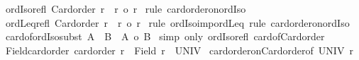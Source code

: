 \begin{isabellebody}
\isanewline
{}\isamarkupfalse%
\ ordIso{\isacharunderscore}{\kern0pt}refl{\isacharcolon}{\kern0pt}\ {\isachardoublequoteopen}Card{\isacharunderscore}{\kern0pt}order\ r\ {\isasymLongrightarrow}\ r\ {\isacharequal}{\kern0pt}o\ r{\isachardoublequoteclose}\isanewline
%
\isadelimproof
%
\endisadelimproof
%
\isatagproof
{}\isamarkupfalse%
\ {\isacharparenleft}{\kern0pt}rule\ card{\isacharunderscore}{\kern0pt}order{\isacharunderscore}{\kern0pt}on{\isacharunderscore}{\kern0pt}ordIso{\isacharparenright}{\kern0pt}%
\endisatagproof
{\isafoldproof}%
%
\isadelimproof
\isanewline
%
\endisadelimproof
\isanewline
{}\isamarkupfalse%
\ ordLeq{\isacharunderscore}{\kern0pt}refl{\isacharcolon}{\kern0pt}\ {\isachardoublequoteopen}Card{\isacharunderscore}{\kern0pt}order\ r\ {\isasymLongrightarrow}\ r\ {\isasymle}o\ r{\isachardoublequoteclose}\isanewline
%
\isadelimproof
%
\endisadelimproof
%
\isatagproof
{}\isamarkupfalse%
\ {\isacharparenleft}{\kern0pt}rule\ ordIso{\isacharunderscore}{\kern0pt}imp{\isacharunderscore}{\kern0pt}ordLeq{\isacharcomma}{\kern0pt}\ rule\ card{\isacharunderscore}{\kern0pt}order{\isacharunderscore}{\kern0pt}on{\isacharunderscore}{\kern0pt}ordIso{\isacharparenright}{\kern0pt}%
\endisatagproof
{\isafoldproof}%
%
\isadelimproof
\isanewline
%
\endisadelimproof
\isanewline
{}\isamarkupfalse%
\ card{\isacharunderscore}{\kern0pt}of{\isacharunderscore}{\kern0pt}ordIso{\isacharunderscore}{\kern0pt}subst{\isacharcolon}{\kern0pt}\ {\isachardoublequoteopen}A\ {\isacharequal}{\kern0pt}\ B\ {\isasymLongrightarrow}\ {\isacharbar}{\kern0pt}A{\isacharbar}{\kern0pt}\ {\isacharequal}{\kern0pt}o\ {\isacharbar}{\kern0pt}B{\isacharbar}{\kern0pt}{\isachardoublequoteclose}\isanewline
%
\isadelimproof
%
\endisadelimproof
%
\isatagproof
{}\isamarkupfalse%
\ {\isacharparenleft}{\kern0pt}simp\ only{\isacharcolon}{\kern0pt}\ ordIso{\isacharunderscore}{\kern0pt}refl\ card{\isacharunderscore}{\kern0pt}of{\isacharunderscore}{\kern0pt}Card{\isacharunderscore}{\kern0pt}order{\isacharparenright}{\kern0pt}%
\endisatagproof
{\isafoldproof}%
%
\isadelimproof
\isanewline
%
\endisadelimproof
\isanewline
{}\isamarkupfalse%
\ Field{\isacharunderscore}{\kern0pt}card{\isacharunderscore}{\kern0pt}order{\isacharcolon}{\kern0pt}\ {\isachardoublequoteopen}card{\isacharunderscore}{\kern0pt}order\ r\ {\isasymLongrightarrow}\ Field\ r\ {\isacharequal}{\kern0pt}\ UNIV{\isachardoublequoteclose}\isanewline
%
\isadelimproof
%
\endisadelimproof
%
\isatagproof
{}\isamarkupfalse%
\ card{\isacharunderscore}{\kern0pt}order{\isacharunderscore}{\kern0pt}on{\isacharunderscore}{\kern0pt}Card{\isacharunderscore}{\kern0pt}order{\isacharbrackleft}{\kern0pt}of\ UNIV\ r{\isacharbrackright}{\kern0pt}\ \isamarkupfalse%

\end{isabellebody}
